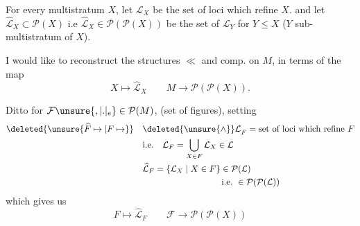  For every multistratum $X$, let $\mathcal{L}_X$  be the set of loci which refine $X$.
and let $\widehat{\mathcal{L}}_X\subset\mathcal P(X)$ i.e $\widehat{\mathcal{L}}_X\in\mathcal P(\mathcal P(X))$ be the set of  $\mathcal{L}_Y$ for $Y\leq X$ ($Y$ sub-multistratum of $X$).  

I would like to reconstruct the structures $\ll$ and comp. on $M$, in terms of the map
\[
 X\longmapsto\widehat{\mathcal{L}}_X\qquad M\longrightarrow\mathcal P(\mathcal P(X)).
\]

 Ditto for $\mathcal F\unsure{,|.|{}_{e}}\in\mathcal P(M)$, (set of figures), setting
\[
\begin{aligned}
\deleted{\unsure{\widehat F\mapsto|F\mapsto}}\quad &{\deleted{\unsure{\wedge}}\mathcal{L}}_F=\text{set of loci which refine }F\\
 &\text{i.e.}\quad \mathcal{L}_F=\bigcup_{X\in F}\mathcal{L}_X\in \mathcal{L}\\
 &\widehat{\mathcal{L}}_F=\{\mathcal{L}_X\mid X\in F\}\in\mathcal P(\mathcal{L})\\
 &\hspace{9em}\text{i.e.}\ \in\mathcal P(\mathcal P(\mathcal{L}))
\end{aligned}
\]
which gives us
\[
 F\longmapsto\widehat{\mathcal{L}}_F\qquad \mathcal F\longrightarrow\mathcal P(\mathcal P(X))
\]

 

